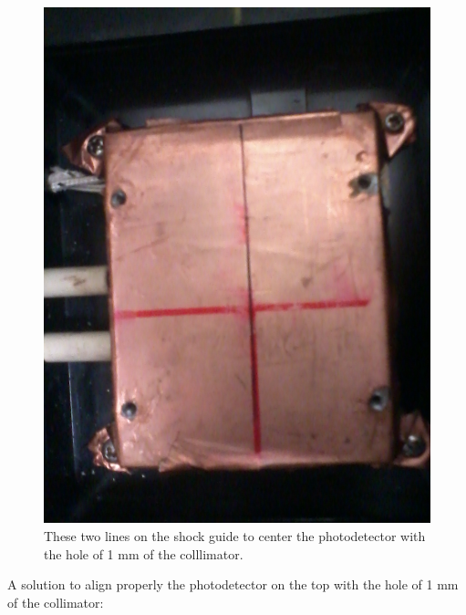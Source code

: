 \documentclass[a4paper, 11pt]{report}%
\begin{document}
  \begin{figure}[!hbtp]
    \centering
    \includegraphics[totalheight=0.4\textwidth,trim=0cm 0cm 0cm 0cm, clip=true]{../Pictures/Pictures_Setup/center_shock.jpg} 
    \caption{These two lines on the shock guide to center the photodetector with the hole of 1 mm of the colllimator.}
    \label{fig:bottom_centered}
  \end{figure}
  
  \newpage
  
  A solution to align properly the photodetector on the top with the hole of 1 mm of the collimator:
  
\end{document}
